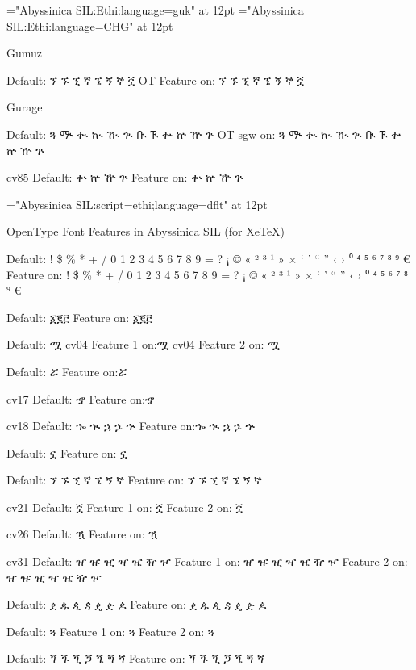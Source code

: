 \font\OTguk="Abyssinica SIL:Ethi:language=guk" at 12pt
\font\OTsgw="Abyssinica SIL:Ethi:language=CHG" at 12pt

\A Gumuz

\IndSS Default: ኘ ኙ ኚ ኛ ኜ ኝ ኞ ኟ
\IndSS\OTguk OT Feature on: ኘ ኙ ኚ ኛ ኜ ኝ ኞ ኟ


\A Gurage

\IndSS  Default: ጓ ᎁ ቊ ኲ ዂ ጒ ᎅ ᎍ ቍ ኵ ዅ ጕ
\IndSS\OTsgw OT sgw on:  ጓ ᎁ ቊ ኲ ዂ ጒ ᎅ ᎍ ቍ ኵ ዅ ጕ

\IndSS cv85 Default: ቍ ኵ ዅ ጕ 
\IndSS\OTeightyfive Feature on: ቍ ኵ ዅ ጕ


\font\C="Abyssinica SIL:script=ethi;language=dflt" at 12pt





\A OpenType Font Features in Abyssinica SIL (for XeTeX)


\IndSS Default: ! \$ \% * + / 0 1 2 3 4 5 6 7 8 9 = ? ¡ © « ² ³ ¹ » × ‘ ’ “ ” ‹ › ⁰ ⁴ ⁵ ⁶ ⁷ ⁸ ⁹ €
\IndSS\OTone Feature on: ! \$ \% * + / 0 1 2 3 4 5 6 7 8 9 = ? ¡ © « ² ³ ¹ » × ‘ ’ “ ” ‹ › ⁰ ⁴ ⁵ ⁶ ⁷ ⁸ ⁹ €

\IndSS Default: ፩፪፫
\IndSS\OTtwo Feature on: ፩፪፫


\IndSS Default: ሟ
\IndSS\OTfourone cv04 Feature 1 on:ሟ
\IndSS\OTfourtwo cv04 Feature 2 on: ሟ

\IndSS Default: ሯ
\IndSS\OTfive Feature on:ሯ

\IndSS cv17 Default: ኇ
\IndSS\OTseventeen Feature on:ኇ

\IndSS cv18 Default: ኈ ኊ ኋ ኌ ኍ
\IndSS\OTeighteen Feature on:ኈ ኊ ኋ ኌ ኍ

\IndSS Default: ኗ
\IndSS\OTnineteen Feature on: ኗ

\IndSS Default: ኘ ኙ ኚ ኛ ኜ ኝ ኞ
\IndSS\OTtwenty Feature on: ኘ ኙ ኚ ኛ ኜ ኝ ኞ

\IndSS cv21 Default: ኟ
\IndSS\OTtwentyoneone Feature 1 on: ኟ
\IndSS\OTtwentyonetwo Feature 2 on: ኟ

\IndSS cv26 Default: ዃ
\IndSS\OTtwentysix Feature on: ዃ

\IndSS cv31 Default: ዠ ዡ ዢ ዣ ዤ ዥ ዦ
\IndSS\OTthirtyoneone Feature 1 on: ዠ ዡ ዢ ዣ ዤ ዥ ዦ
\IndSS\OTthirtyonetwo Feature 2 on: ዠ ዡ ዢ ዣ ዤ ዥ ዦ

\IndSS Default: ዸ ዹ ዺ ዻ ዼ ዽ ዾ
\IndSS\OTthirtytwo Feature on: ዸ ዹ ዺ ዻ ዼ ዽ ዾ

\IndSS Default: ጓ
\IndSS\OTfortyone Feature 1 on: ጓ
\IndSS\OTfortytwo Feature 2 on: ጓ

\IndSS Default: ጘ ጙ ጚ ጛ ጜ ጝ ጞ
\IndSS\OTfortyoneone Feature on: ጘ ጙ ጚ ጛ ጜ ጝ ጞ

